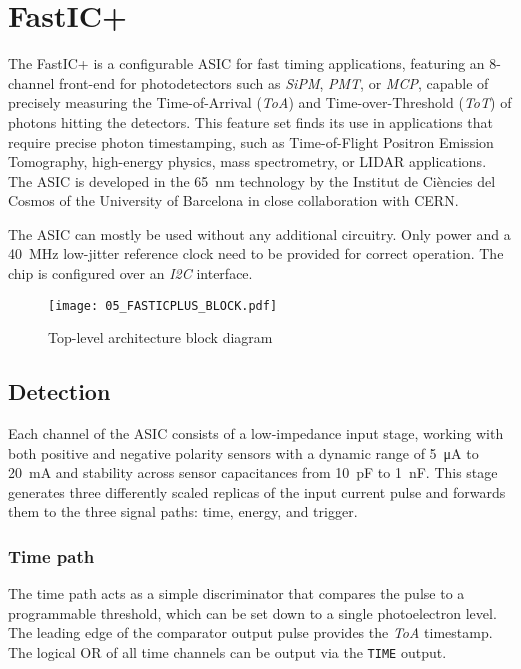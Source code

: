 \chapter{FastIC+}
\label{sec:fastic}
The FastIC+ is a configurable ASIC for fast timing applications, featuring an 8-channel front-end for photodetectors such as \emph{SiPM}, \emph{PMT}, or \emph{MCP}, capable of precisely measuring the Time-of-Arrival (\emph{ToA}) and Time-over-Threshold (\emph{ToT}) of photons hitting the detectors. This feature set finds its use in applications that require precise photon timestamping, such as Time-of-Flight Positron Emission Tomography, high-energy physics, mass spectrometry, or LIDAR applications. The ASIC is developed in the \SI{65}{\nano\meter} technology by the Institut de Ciències del Cosmos of the University of Barcelona in close collaboration with CERN. 

The ASIC can mostly be used without any additional circuitry. Only power and a \SI{40}{\mega\hertz} low-jitter reference clock need to be provided for correct operation. The chip is configured over an \emph{I2C} interface.

\FloatBarrier
\begin{figure}[htp!]
    \centering
    \texttt{[image: 05\_FASTICPLUS\_BLOCK.pdf]}
    \caption{Top-level architecture block diagram}
    \label{fig:fastic_top_level}
\end{figure}
\FloatBarrier



\section{Detection}
Each channel of the ASIC consists of a low-impedance input stage, working with both positive and negative polarity sensors with a dynamic range of \SI{5}{\micro\ampere} to \SI{20}{\milli\ampere} and stability across sensor capacitances from \SI{10}{\pico\farad} to \SI{1}{\nano\farad}. This stage generates three differently scaled replicas of the input current pulse and forwards them to the three signal paths: time, energy, and trigger.
%
\subsection{Time path}
The time path acts as a simple discriminator that compares the pulse to a programmable threshold, which can be set down to a single photoelectron level. The leading edge of the comparator output pulse provides the \emph{ToA} timestamp. The logical OR of all time channels can be output via the \verb|TIME| output. 
%

